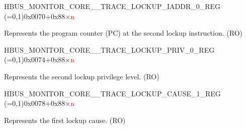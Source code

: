 \begin{register}{H}{BUS\_MONITOR\_CORE\_\_TRACE\_LOCKUP\_IADDR\_0\_REG (=0,1)}{0x0070+0x88×\textcolor{red}{n}}\label{regdesc:BUSMONITORCORE0TRACELOCKUPIADDR0REG}
%
\regnewline%
\begin{regdesc}\begin{reglist}
\label{fielddesc:BUSMONITORCORE0TRACELOCKUPRECORDINGIADDR0}\item [BUS\_MONITOR\_CORE\_\regindex{n}\_TRACE\_LOCKUP\_RECORDING\_IADDR\_0] Represents the program counter (PC) at the second lockup instruction. (RO)


\end{reglist}\end{regdesc}
\end{register}


\begin{register}{H}{BUS\_MONITOR\_CORE\_\_TRACE\_LOCKUP\_PRIV\_0\_REG (=0,1)}{0x0074+0x88×\textcolor{red}{n}}\label{regdesc:BUSMONITORCORE0TRACELOCKUPPRIV0REG}
%
%
\regnewline%
\begin{regdesc}\begin{reglist}
\label{fielddesc:BUSMONITORCORE0TRACELOCKUPRECORDINGPRIV0}\item [BUS\_MONITOR\_CORE\_\regindex{n}\_TRACE\_LOCKUP\_RECORDING\_PRIV\_0] Represents the second lockup privilege level. (RO)
\end{reglist}\end{regdesc}
\end{register}


\begin{register}{H}{BUS\_MONITOR\_CORE\_\_TRACE\_LOCKUP\_CAUSE\_1\_REG (=0,1)}{0x0078+0x88×\textcolor{red}{n}}\label{regdesc:BUSMONITORCORE0TRACELOCKUPCAUSE1REG}
%
%
\regnewline%
\begin{regdesc}\begin{reglist}
\label{fielddesc:BUSMONITORCORE0TRACELOCKUPRECORDINGCAUSE1}\item [BUS\_MONITOR\_CORE\_\regindex{n}\_TRACE\_LOCKUP\_RECORDING\_CAUSE\_1] Represents the first lockup cause. (RO)
\end{reglist}\end{regdesc}
\end{register}


